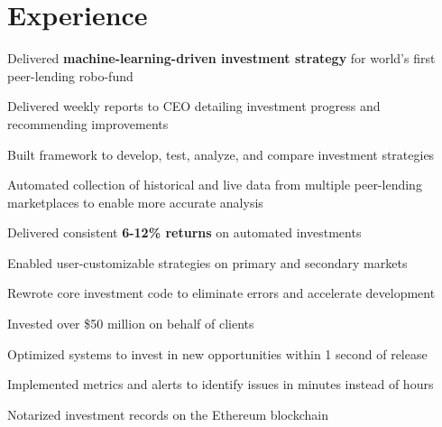 \documentclass[]{resume}
\begin{document}
\begin{minipage}[t]{0.66\textwidth}



\section{Experience}

\vspace{\topsep} %
\begin{tightemize}
\item Delivered \textbf{machine-learning-driven investment strategy} for world's first peer-lending robo-fund
\item Delivered weekly reports to CEO detailing investment progress and recommending improvements
\item Built framework to develop, test, analyze, and compare investment strategies
\item Automated collection of historical and live data from multiple peer-lending marketplaces to enable more accurate analysis
\item Delivered consistent \textbf{6-12\% returns} on automated investments
\item Enabled user-customizable strategies on primary and secondary markets
\item Rewrote core investment code to eliminate errors and accelerate development
\item Invested over \$50 million on behalf of clients
\item Optimized systems to invest in new opportunities within 1 second of release
\item Implemented metrics and alerts to identify issues in minutes instead of hours
\item Notarized investment records on the Ethereum blockchain
\end{tightemize}
\sectionsep


\end{minipage}
\end{document}
